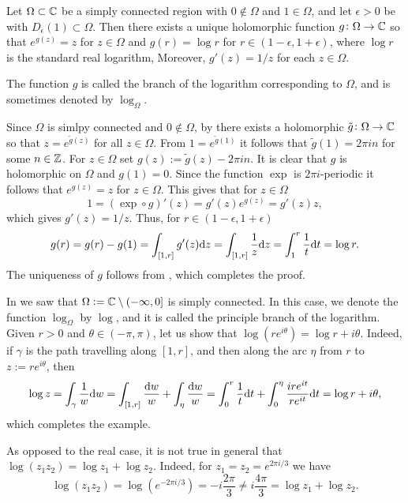 \documentclass[11pt,a4paper]{article}
\begin{document}
\begin{corollary}
  \label{cor:log}
  Let $\Omega \subset \mathbb{C}$ be a simply connected region with $0 \notin \Omega$
  and $1 \in \Omega$,
  and let $\epsilon > 0$ be with $D_{\epsilon}(1) \subset \Omega$.
  Then there exists a unique holomorphic function $g \colon \Omega \to \mathbb{C}$
  so that $e^{g(z)} = z$ for $z \in \Omega$ and $g(r) = \log r$ for
  $r \in (1 - \epsilon, 1 + \epsilon)$, where $\log r$ is the standard real
  logarithm,
  Moreover, $g'(z) = 1 / z$ for each $z \in \Omega$.
\end{corollary}
\begin{remark}
  The function $g$ is called the branch of the logarithm corresponding
  to $\Omega$, and is sometimes denoted by $\log_{\Omega}$.
\end{remark}
\begin{proofof}{}
  Since $\Omega$ is simlpy connected and $0 \notin \Omega$,
  by  there exists a holomorphic
  $\tilde g \colon \Omega \to \mathbb{C}$ so that $z = e^{\tilde g(z)}$
  for all $z \in \Omega$.
  From $1 = e^{\tilde g(1)}$ it follows that $\tilde g(1) = 2 \pi i n$ for some
  $n \in \mathbb{Z}$.
  For $z \in \Omega$ set $g(z) := \tilde g(z) - 2 \pi i n$.
  It is clear that $g$ is holomorphic on $\Omega$ and $g(1) = 0$.
  Since the function $\exp$ is $2 \pi i$-periodic it follows that
  $e^{g(z)} = z$ for $z \in \Omega$.
  This gives that for $z \in \Omega$
  \[
    1 = (\exp \circ g)'(z) = g'(z) e^{g(z)} = g'(z)z,
  \]
  which gives $g'(z) = 1 / z$.
  Thus, for $r \in (1 - \epsilon, 1 + \epsilon)$
  \[
    g(r) =
    g(r) - g(1) =
    \int_{[1,r]} g'(z) \mathrm{d} z =
    \int_{[1,r]} \frac{1}{z} \mathrm{d} z =
    \int_{1}^{r} \frac{1}{t} \mathrm{d} t = \log r.
  \]
  The uniqueness of $g$ follows from ,
  which completes the proof.
\end{proofof}

\begin{example}
  In  we saw that
  $\Omega := \mathbb{C} \setminus (-\infty,0]$ is simply connected.
  In this case, we denote the function $\log_{\Omega}$
  by $\log$, and it is called the principle branch of the logarithm.
  Given $r > 0$ and $\theta \in (-\pi,\pi)$,
  let us show that $\log(r e^{i \theta}) = \log r + i\theta$.
  Indeed, if $\gamma$ is the path travelling along $[1,r]$,
  and then along the arc $\eta$ from $r$ to $z := r e^{i \theta}$,
  then
  \[
    \log z =
    \int_{\gamma} \frac{1}{w} \mathrm{d} w =
    \int_{[1,r]} \frac{\mathrm{d} w}{w} +
    \int_{\eta} \frac{\mathrm{d} w}{w} =
    \int_{0}^{r} \frac{1}{t} \mathrm{d} t +
    \int_{0}^{\eta} \frac{i r e^{i t}}{r e^{i t}} \mathrm{d} t =
    \log r + i \theta,
  \]
  which completes the example.
\end{example}
\begin{remark}
  As opposed to the real case,
  it is not true in general that $\log(z_1 z_2) = \log z_1 + \log z_2$.
  Indeed, for $z_1 = z_2 = e^{2\pi i/3}$ we have
  \[
    \log(z_1 z_2) =
    \log(e^{-2\pi i/3}) =
    -i \frac{2\pi}{3} \neq
    i \frac{4 \pi}{3} =
    \log z_1 + \log z_2.
  \]
\end{remark}
%
\end{document}
